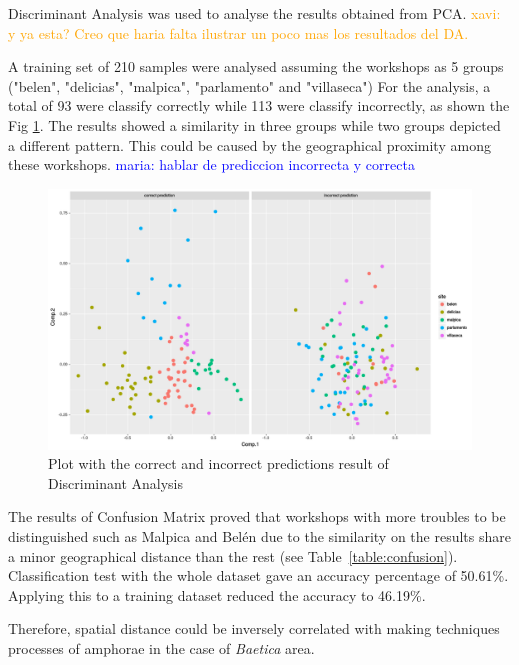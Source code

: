 \documentclass[review]{elsarticle}
\newcommand{\memo}[2]{\textcolor{#1}{#2}}
\newcommand{\xavi}[1]{\memo{orange}{xavi: #1\\}}
\newcommand{\maria}[1]{\memo{blue}{maria: #1\\}}
\begin{document}
Discriminant Analysis was used to analyse the results obtained from PCA. \xavi{y ya esta? Creo que haria falta ilustrar un poco mas los resultados del DA.} 

A training set of 210 samples were analysed assuming the workshops as 5 groups ("belen", "delicias", "malpica", "parlamento" and "villaseca") For the analysis, a total of 93 were classify correctly while 113 were classify incorrectly, as shown the Fig \ref{prediction}. The results showed a similarity in three groups while two groups depicted a different pattern.  This could be caused by the geographical proximity among these workshops. 
\maria{hablar de prediccion incorrecta y correcta}

\begin{figure}[htp]
	\centering
\includegraphics[scale=0.35]{prediction.png}
\caption{Plot with the correct and incorrect predictions result of Discriminant Analysis}
\label{prediction}
\end{figure} 

The results of Confusion Matrix proved that workshops with more troubles to be distinguished such as Malpica and Bel\'en due to the similarity on the results share a minor geographical distance than the rest (see Table~\ref{table:confusion}). Classification test with the whole dataset gave an accuracy percentage of 50.61\%. Applying this to a training dataset reduced the accuracy to 46.19\%.  



Therefore, spatial distance could be inversely correlated with making techniques processes of amphorae in the case of \textit{Baetica} area. 
\end{document}
